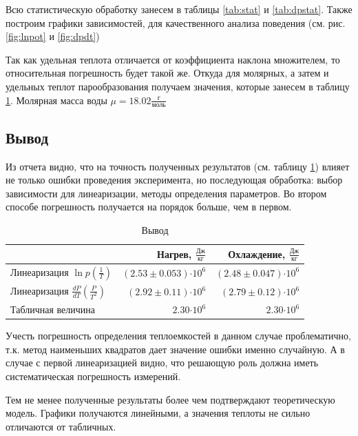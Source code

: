 \documentclass[12pt,a4paper]{article}
\newcommand{\e}[1]{\text{$\cdot10^{#1}$}}
\begin{document}
Всю статистическую обработку занесем в таблицы \ref{tab:stat} и \ref{tab:dpstat}. Также построим графики зависимостей, для качественного анализа поведения (см. рис. \ref{fig:lnpot} и \ref{fig:dpdt})

Так как удельная теплота отличается от коэффициента наклона множителем, то относительная погрешность будет такой же. Откуда для молярных, а затем и удельных теплот парообразования получаем значения, которые занесем в таблицу \ref{tab:itog}. Молярная масса воды $\mu = 18.02 \frac{\text{г}}{\text{моль}}$



\subsection*{Вывод}


Из отчета видно, что на точность полученных результатов (см. таблицу \ref{tab:itog}) влияет не только ошибки проведения эксперимента, но последующая обработка: выбор зависимости для линеаризации, методы определения параметров. Во втором способе погрешность получается на порядок больше, чем в первом.


\begin{table}[H]
	\caption{Вывод}
	\label{tab:itog}
	\centering
	\footnotesize
	\begin{tabular}{l|r|r}
		\toprule
		$ $ & Нагрев, $\frac{\text{Дж}}{\text{кг}}$& Охлаждение, $\frac{\text{Дж}}{\text{кг}}$ \\ \midrule
		Линеаризация $\ln{p}(\frac{1}{T})$          & $(2.53 \pm 0.053)\e{6}$ & $(2.48 \pm 0.047)\e{6}$  \\ \midrule 
		Линеаризация $\frac{dP}{dT}(\frac{P}{T^2})$ & $(2.92 \pm 0.11)\e{6}$ & $(2.79 \pm 0.12)\e{6} $  \\ \midrule
		Табличная величина 							& $2.30\e{6} $ & $2.30\e{6} $  \\ 
		\bottomrule
	\end{tabular}
\end{table}

Учесть погрешность определения теплоемкостей в данном случае проблематично, т.к. метод наименьших квадратов дает значение ошибки именно случайную. А в случае с первой линеаризацией видно, что решающую роль должна иметь систематическая погрешность измерений.


Тем не менее полученные результаты более чем подтверждают теоретическую модель. Графики получаются линейными, а значения теплоты не сильно отличаются от табличных.
 
\end{document}
